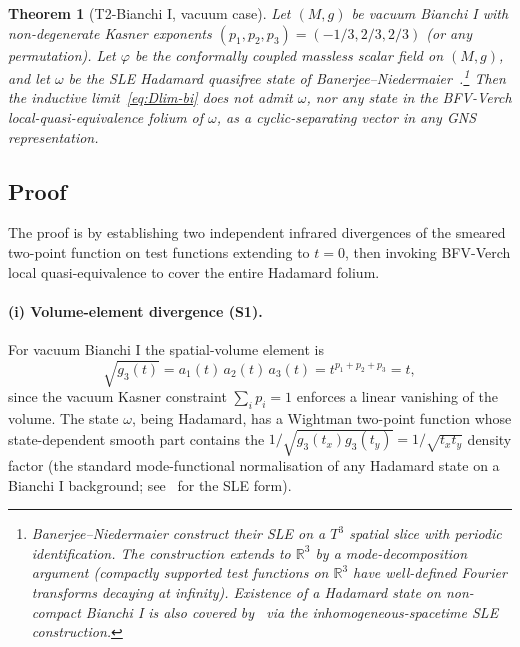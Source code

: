 \documentclass[11pt]{article}
\newtheorem{theorem}{Theorem}
\theoremstyle{definition}
\newcommand{\R}{\mathbb{R}}
\begin{document}
\begin{theorem}[T2-Bianchi I, vacuum case]\label{thm:T2-BI}
Let $(M,g)$ be vacuum Bianchi I with non-degenerate Kasner exponents $(p_1,p_2,p_3)=(-1/3,2/3,2/3)$ (or any permutation). Let $\varphi$ be the conformally coupled massless scalar field on $(M,g)$, and let $\omega$ be the SLE Hadamard quasifree state of Banerjee--Niedermaier~\cite{BanerjeeNiedermaier2023}.\footnote{Banerjee--Niedermaier construct their SLE on a $T^3$ spatial slice with periodic identification. The construction extends to $\R^3$ by a mode-decomposition argument (compactly supported test functions on $\R^3$ have well-defined Fourier transforms decaying at infinity). Existence of a Hadamard state on non-compact Bianchi I is also covered by~\cite{BrumThem2013} via the inhomogeneous-spacetime SLE construction.} Then the inductive limit~\eqref{eq:Dlim-bi} does not admit $\omega$, nor any state in the BFV-Verch local-quasi-equivalence folium of $\omega$, as a cyclic-separating vector in any GNS representation.
\end{theorem}

\subsection{Proof}\label{sec:T2-proof}

The proof is by establishing two independent infrared divergences of the smeared two-point function on test functions extending to $t=0$, then invoking BFV-Verch local quasi-equivalence to cover the entire Hadamard folium.

\paragraph{(i) Volume-element divergence (S1).}

For vacuum Bianchi I the spatial-volume element is
\begin{equation}\label{eq:vol-element}
\sqrt{g_3(t)} = a_1(t)\,a_2(t)\,a_3(t) = t^{p_1+p_2+p_3} = t,
\end{equation}
since the vacuum Kasner constraint $\sum_i p_i = 1$ enforces a linear vanishing of the volume. The state $\omega$, being Hadamard, has a Wightman two-point function whose state-dependent smooth part contains the $1/\sqrt{g_3(t_x)g_3(t_y)} = 1/\sqrt{t_x t_y}$ density factor (the standard mode-functional normalisation of any Hadamard state on a Bianchi I background; see~\cite[\S3]{BanerjeeNiedermaier2023} for the SLE form).
\end{document}
